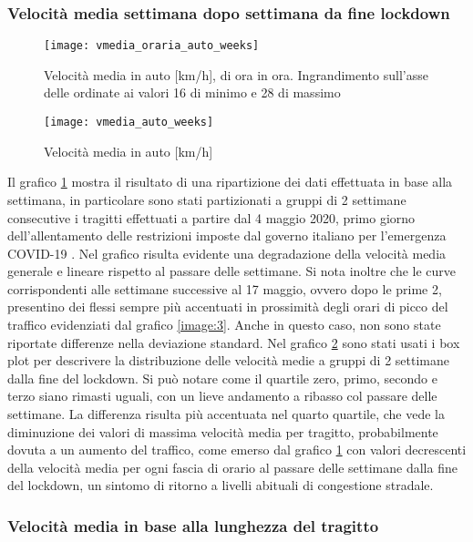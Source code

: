\subsubsection{Velocità media settimana dopo settimana da fine lockdown}

\begin{figure}[H]
\texttt{[image: vmedia\_oraria\_auto\_weeks]}
\caption{Velocità media in auto [km/h], di ora in ora. Ingrandimento sull'asse delle ordinate ai valori 16 di minimo e 28 di massimo}
\label{image:5}
\end{figure}

\begin{figure}[H]
	\texttt{[image: vmedia\_auto\_weeks]}
	\caption{Velocità media in auto [km/h]}
	\label{image:27}
\end{figure}

Il grafico \ref{image:5} mostra il risultato di una ripartizione dei dati effettuata in base alla settimana, in particolare sono stati partizionati a gruppi di 2 settimane consecutive i tragitti effettuati a partire dal 4 maggio 2020, primo giorno dell'allentamento delle restrizioni imposte dal governo italiano per l'emergenza COVID-19 \cite{misuredelgovernopercovid}. Nel grafico risulta evidente una degradazione della velocità media generale e lineare rispetto al passare delle settimane. Si nota inoltre che le curve corrispondenti alle settimane successive al 17 maggio, ovvero dopo le prime 2, presentino dei flessi sempre più accentuati in prossimità degli orari di picco del traffico evidenziati dal grafico \ref{image:3}. Anche in questo caso, non sono state riportate differenze nella deviazione standard.
Nel grafico \ref{image:27} sono stati usati i box plot per descrivere la distribuzione delle velocità medie a gruppi di 2 settimane dalla fine del lockdown. Si può notare come il quartile zero, primo, secondo e terzo siano rimasti uguali, con un lieve andamento a ribasso col passare delle settimane. La differenza risulta più accentuata nel quarto quartile, che vede la diminuzione dei valori di massima velocità media per tragitto, probabilmente dovuta a un aumento del traffico, come emerso dal grafico \ref{image:5} con valori decrescenti della velocità media per ogni fascia di orario al passare delle settimane dalla fine del lockdown, un sintomo di ritorno a livelli abituali di congestione stradale.

\subsubsection{Velocità media in base alla lunghezza del tragitto}

